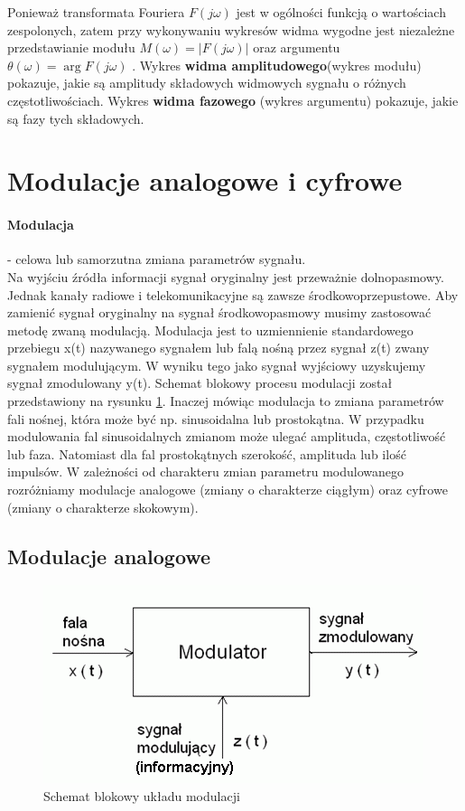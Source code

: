 \documentclass[a4paper,twoside]{report}
\begin{document}
Ponieważ transformata Fouriera  $ F(j \omega) $ jest w ogólności funkcją o wartościach zespolonych, zatem przy wykonywaniu wykresów widma wygodne jest niezależne przedstawianie modułu  $ M(\omega) = | F(j \omega) | $ oraz argumentu $ \theta(\omega) = \arg{F(j \omega)} $ . Wykres \textbf{widma amplitudowego}(wykres modułu) pokazuje, jakie są amplitudy składowych widmowych sygnału o różnych częstotliwościach. Wykres \textbf{widma fazowego} (wykres argumentu) pokazuje, jakie są fazy tych składowych.
\section{Modulacje analogowe i cyfrowe}
\paragraph{Modulacja} - celowa lub samorzutna zmiana parametrów sygnału. \\

Na wyjściu źródła informacji sygnał oryginalny jest przeważnie dolnopasmowy. Jednak kanały radiowe i telekomunikacyjne są zawsze środkowoprzepustowe. Aby zamienić sygnał oryginalny na sygnał środkowopasmowy musimy zastosować metodę zwaną modulacją. Modulacja jest to uzmiennienie standardowego przebiegu x(t) nazywanego sygnałem lub falą nośną przez sygnał z(t) zwany sygnałem modulującym. W wyniku tego jako sygnał wyjściowy uzyskujemy sygnał zmodulowany y(t). Schemat blokowy procesu modulacji został przedstawiony na rysunku \ref{rys:modulacja_blok}. Inaczej mówiąc modulacja to zmiana parametrów fali nośnej, która może być np. sinusoidalna lub prostokątna. W przypadku modulowania fal sinusoidalnych zmianom może ulegać amplituda, częstotliwość lub faza. Natomiast dla fal prostokątnych szerokość, amplituda lub ilość impulsów. W zależności od charakteru zmian parametru modulowanego rozróżniamy modulacje analogowe (zmiany o charakterze ciągłym) oraz cyfrowe (zmiany o charakterze skokowym).
\subsection{Modulacje analogowe}

\begin{figure}[htbp]
\centering
\includegraphics[scale=0.7]{obrazy/modulacja_blok.png}
\caption{Schemat blokowy układu modulacji}
\label{rys:modulacja_blok}
\end{figure}
\end{document}
